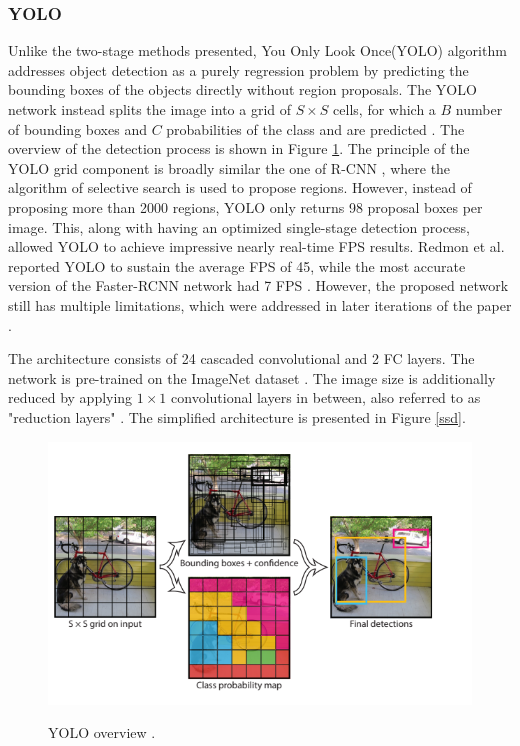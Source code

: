 \FloatBarrier

\subsubsection{YOLO}
\label{yolo_section} 

Unlike the two-stage methods presented, You Only Look Once(YOLO) \cite{Redmon2015a} algorithm addresses object detection as a purely regression problem by predicting the bounding boxes of the objects directly without region proposals. The YOLO network instead splits the image into a grid of $S\times S$ cells, for which a $B$ number of bounding boxes and $C$ probabilities of the class and  are predicted \cite{Redmon2015a}. The overview of the detection process is shown in Figure \ref{yolo}. The principle of the YOLO grid component is broadly similar the one of R-CNN \cite{Girshick2013}, where the algorithm of selective search \cite{Uijlings13} is used to propose regions. However, instead of proposing more than 2000 regions, YOLO only returns 98 proposal boxes per image. This, along with having an optimized single-stage detection process, allowed YOLO to achieve impressive nearly real-time FPS results. Redmon et al. reported YOLO to sustain the average FPS of 45, while the most accurate version of the Faster-RCNN network had 7 FPS \cite{Redmon2015a}. However, the proposed network still has multiple limitations, which were addressed in later iterations of the paper  \cite{Redmon2016, Redmon2018a}.

The architecture consists of 24 cascaded convolutional and 2 FC layers. The network is pre-trained on the ImageNet dataset \cite{Russakovsky2014}. The image size is additionally reduced by applying $1\times1$ convolutional layers in between, also referred to as "reduction layers"  \cite{Redmon2015a}. The simplified architecture is presented in Figure \ref{ssd}.

\begin{figure}[htb]
	\begin{center}
		\includegraphics[width=12cm]{./yolo.png}
	\end{center}
	\caption{YOLO overview \cite{Redmon2015a}.}
	\begin{center}
		\label{yolo}
	\end{center}
\end{figure}
\FloatBarrier


